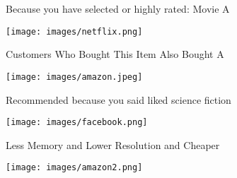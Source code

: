 \documentclass[11pt,aspectratio=169,handout]{beamer}
\begin{document}
\begin{frame}

\begin{tcolorbox}[colback=info!5,colframe=info!80,title=Case-based]
Because you have selected or highly rated: Movie A
\end{tcolorbox}

\vfill

\begin{center}
\texttt{[image: images/netflix.png]}
\end{center}

\end{frame}

\begin{frame}

\begin{tcolorbox}[colback=info!5,colframe=info!80,title=Collaborative]
Customers Who Bought This Item Also Bought A
\end{tcolorbox}

\vfill

\begin{center}
\texttt{[image: images/amazon.jpeg]}
\end{center}

\end{frame}

\begin{frame}

\begin{tcolorbox}[colback=info!5,colframe=info!80,title=Content-based]
Recommended because you said liked science fiction
\end{tcolorbox}

\vfill

\begin{center}
\texttt{[image: images/facebook.png]}
\end{center}

\end{frame}

\begin{frame}

\begin{tcolorbox}[colback=info!5,colframe=info!80,title=Knowledge-based]
Less Memory and Lower Resolution and Cheaper
\end{tcolorbox}

\vfill

\begin{center}
\texttt{[image: images/amazon2.png]}
\end{center}

\end{frame}
\end{document}
